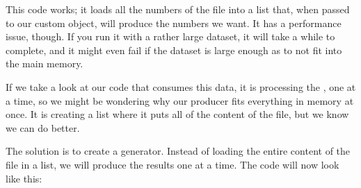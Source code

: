 \documentclass[a4paper,10pt,english]{sphinxmanual}
\begin{document}
\begin{sphinxVerbatim}[commandchars=\\\{\}]
 
      \PYG{p}{[}\PYG{p}{]}
       
           
               

     
\end{sphinxVerbatim}

This code works; it loads all the numbers of the file into a list that, when passed to our
custom object, will produce the numbers we want. It has a performance issue, though. If
you run it with a rather large dataset, it will take a while to complete, and it might even fail
if the dataset is large enough as to not fit into the main memory.

If we take a look at our code that consumes this data, it is processing the , one at
a time, so we might be wondering why our producer fits everything in memory at once. It
is creating a list where it puts all of the content of the file, but we know we can do better.

The solution is to create a generator. Instead of loading the entire content of the file in a list,
we will produce the results one at a time. The code will now look like this:

\begin{sphinxVerbatim}[commandchars=\\\{\}]
 
       
           
               
             
\end{sphinxVerbatim}
\end{document}
